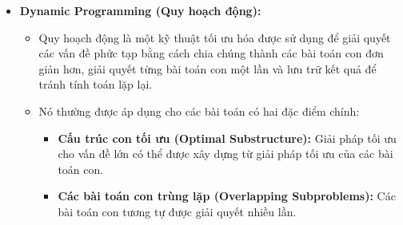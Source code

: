 \documentclass{article}
\begin{document}
\begin{itemize}
    \item \textbf{Dynamic Programming (Quy hoạch động):}
    \begin{itemize}
        \item Quy hoạch động là một kỹ thuật tối ưu hóa được sử dụng để giải quyết các vấn đề phức tạp bằng cách chia chúng thành các bài toán con đơn giản hơn, giải quyết từng bài toán con một lần và lưu trữ kết quả để tránh tính toán lặp lại.
        \item Nó thường được áp dụng cho các bài toán có hai đặc điểm chính:
            \begin{itemize}
                \item \textbf{Cấu trúc con tối ưu (Optimal Substructure):} Giải pháp tối ưu cho vấn đề lớn có thể được xây dựng từ giải pháp tối ưu của các bài toán con.
                \item \textbf{Các bài toán con trùng lặp (Overlapping Subproblems):} Các bài toán con tương tự được giải quyết nhiều lần.
            \end{itemize}
    \end{itemize}


\end{itemize}
\end{document}

